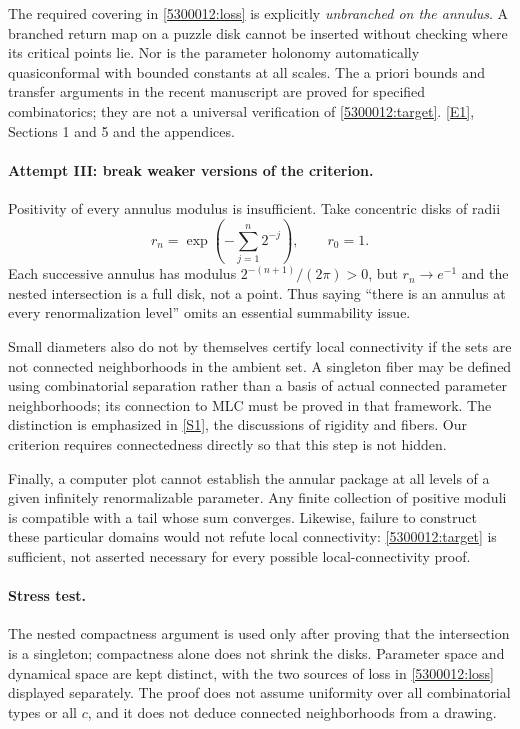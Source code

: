 \documentclass[11pt,a4paper]{article}
\newcommand{\sref}[2]{\hyperlink{source:#1:#2}{[S#2]}}
\newcommand{\eref}[2]{\hyperlink{extra:#1:#2}{[E#2]}}
\numberwithin{equation}{section}
\begin{document}
The required covering in \eqref{5300012:loss} is explicitly \emph{unbranched
on the annulus}.  A branched return map on a puzzle disk cannot be
inserted without checking where its critical points lie.  Nor is the
parameter holonomy automatically quasiconformal with bounded constants
at all scales.  The a priori bounds and transfer arguments in the
recent manuscript are proved for specified combinatorics; they are
not a universal verification of \eqref{5300012:target}.
\eref{5300012}{1}, Sections 1 and 5 and the appendices.

\paragraph{Attempt III: break weaker versions of the criterion.}
Positivity of every annulus modulus is insufficient.  Take concentric
disks of radii
\[
 r_n=\exp\!\left(-\sum_{j=1}^{n}2^{-j}\right),\qquad r_0=1.
\]
Each successive annulus has modulus $2^{-(n+1)}/(2\pi)>0$, but
$r_n\to e^{-1}$ and the nested intersection is a full disk, not a
point.  Thus saying ``there is an annulus at every renormalization
level'' omits an essential summability issue.

Small diameters also do not by themselves certify local connectivity
if the sets are not connected neighborhoods in the ambient set.
A singleton fiber may be defined using combinatorial separation rather
than a basis of actual connected parameter neighborhoods; its
connection to MLC must be proved in that framework.  The distinction
is emphasized in \sref{5300012}{1}, the discussions of rigidity and fibers.
Our criterion requires connectedness directly so that this step is
not hidden.

Finally, a computer plot cannot establish the annular package at all
levels of a given infinitely renormalizable parameter.  Any finite
collection of positive moduli is compatible with a tail whose sum
converges.  Likewise, failure to construct these particular domains
would not refute local connectivity: \eqref{5300012:target} is sufficient,
not asserted necessary for every possible local-connectivity proof.

\paragraph{Stress test.}
The nested compactness argument is used only after proving that the
intersection is a singleton; compactness alone does not shrink the
disks.  Parameter space and dynamical space are kept distinct, with
the two sources of loss in \eqref{5300012:loss} displayed separately.
The proof does not assume uniformity over all combinatorial types or
all $c$, and it does not deduce connected neighborhoods from a drawing.
\end{document}
